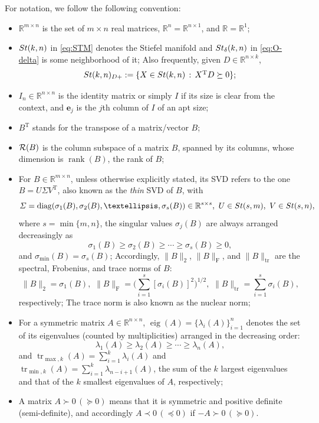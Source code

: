 \documentclass[11pt]{article}
\def\be{\pmb{e}}
\def\bbR{\mathbb{R}}
\def\cR{{\cal R}}
\newcommand\STM[2]{{\rm St}(#1,#2)}
\newcommand\STMnbr{{\rm St}_{\delta}(k,n)}
\DeclareMathOperator{\diag}{diag}
\DeclareMathOperator{\eig}{eig}
\DeclareMathOperator{\rank}{rank}
\DeclareMathOperator{\tr}{tr}
\DeclareMathOperator{\F}{F}
\DeclareMathOperator{\T}{T}
\theoremstyle{definition}
\numberwithin{equation}{section}
\begin{document}

For notation, we follow the following convention:
\begin{itemize}
  \item $\bbR^{m\times n}$  is the set of $m\times n$ real matrices,  $\bbR^n=\bbR^{n\times 1}$, and $\bbR=\bbR^1$;
  \item $\STM{k}{n}$ in \eqref{eq:STM} denotes the Stiefel manifold and
        $\STMnbr$ in \eqref{eq:O-delta} is  some neighborhood of it; Also frequently, given  $D\in\bbR^{n\times k}$,
        $$
        \STM{k}{n}_{D+}:=\{X\in\STM{k}{n}\,:\, X^{\T}D\succeq 0\};
        $$
  \item $I_n\in\bbR^{n\times n}$ is the identity matrix or simply $I$ if its size is clear from the context, and $\be_j$ is the $j$th column of $I$ of an apt size;
  \item $B^{\T}$ stands for the transpose of a matrix/vector $B$;
  \item $\cR(B)$ is the column subspace of a matrix $B$, spanned by its columns, whose dimension is $\rank(B)$, the rank of $B$;
  \item For $B\in\bbR^{m\times n}$, unless otherwise explicitly stated, its SVD
        refers to the one $B=U\Sigma V^{\T}$, also known as the {\em thin\/} SVD of $B$,  with
        $$
        \Sigma=\diag(\sigma_1(B),\sigma_2(B),\ldots,\sigma_s(B))\in\bbR^{s\times s},
        \,\,
        U\in\STM{s}{m},\,\,
        V\in\STM{s}{n},
        $$
        where $s=\min\{m,n\}$,  the singular values $\sigma_j(B)$  are always arranged decreasingly as
        $$
        \sigma_1(B)\ge\sigma_2(B)\ge\cdots\ge\sigma_s(B)\ge 0,
        $$
        and $\sigma_{\min}(B)=\sigma_s(B)$;
        Accordingly, $\|B\|_2$, $\|B\|_{\F}$, and $\|B\|_{\tr}$ are the spectral, Frobenius, and
        trace         norms of $B$:
        $$
        \|B\|_2=\sigma_1(B),\,\,
        \|B\|_{\F}=\Big(\sum_{i=1}^s[\sigma_i(B)]^2\Big)^{1/2},\,\,
        \|B\|_{\tr}=\sum_{i=1}^s\sigma_i(B),
        $$
        respectively; The trace norm is  also known as the nuclear norm;
  \item For a symmetric matrix $A\in\bbR^{n\times n}$, $\eig(A)=\{\lambda_i(A)\}_{i=1}^n$ denotes the set of its
        eigenvalues (counted by multiplicities)
        arranged in the decreasing order:
        $$
        \lambda_1(A)\ge\lambda_2(A)\ge\cdots\ge\lambda_n(A),
        $$
        and $\tr_{\max,k}(A)=\sum_{i=1}^k\lambda_i(A)$ and $\tr_{\min,k}(A)=\sum_{i=1}^k\lambda_{n-i+1}(A)$,
        the sum of the $k$ largest  eigenvalues and that of the $k$ smallest  eigenvalues of $A$, respectively;
  \item A matrix $A\succ 0\, (\succeq 0)$ means that it is symmetric and positive definite (semi-definite), and
        accordingly
        $A\prec 0\, (\preceq 0)$ if $-A\succ 0\, (\succeq 0)$.
\end{itemize}
\end{document}
